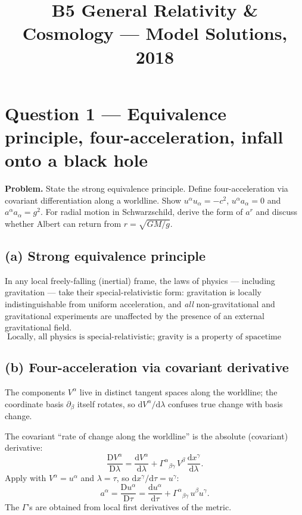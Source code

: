 \documentclass[11pt]{article}
\title{B5 General Relativity \& Cosmology --- Model Solutions, 2018}
\author{}
\date{}
\newcommand{\D}{\mathrm{D}}
\newcommand{\de}{\mathrm{d}}
\begin{document}
\maketitle

\section*{Question 1 --- Equivalence principle, four-acceleration, infall onto a black hole}

\textbf{Problem.} State the strong equivalence principle. Define four-acceleration via covariant differentiation along a worldline. Show $u^\alpha u_\alpha = -c^2$, $u^\alpha a_\alpha = 0$ and $a^\alpha a_\alpha = g^2$. For radial motion in Schwarzschild, derive the form of $a^r$ and discuss whether Albert can return from $r=\sqrt{GM/g}$.

\subsection*{(a) Strong equivalence principle}

In any local freely-falling (inertial) frame, the laws of physics --- including gravitation --- take their special-relativistic form: gravitation is locally indistinguishable from uniform acceleration, and \emph{all} non-gravitational and gravitational experiments are unaffected by the presence of an external gravitational field.
\[
\boxed{\;\text{Locally, all physics is special-relativistic; gravity is a property of spacetime curvature, not a force.}\;}
\]

\subsection*{(b) Four-acceleration via covariant derivative}

The components $V^\alpha$ live in distinct tangent spaces along the worldline; the coordinate basis $\partial_\beta$ itself rotates, so $\de V^\alpha/\de\lambda$ confuses true change with basis change.

The covariant ``rate of change along the worldline'' is the absolute (covariant) derivative:
\[
\frac{\D V^\alpha}{\D\lambda} = \frac{\de V^\alpha}{\de\lambda} + \Gamma^{\alpha}{}_{\beta\gamma}\,V^\beta\,\frac{\de x^\gamma}{\de\lambda}.
\]
Apply with $V^\alpha = u^\alpha$ and $\lambda = \tau$, so $\de x^\gamma/\de\tau = u^\gamma$:
\[
\boxed{\;a^\alpha = \frac{\D u^\alpha}{\D\tau} = \frac{\de u^\alpha}{\de\tau} + \Gamma^{\alpha}{}_{\beta\gamma}\,u^\beta u^\gamma.\;}
\label{eq:fouracc}
\]
The $\Gamma$'s are obtained from local first derivatives of the metric.
\end{document}
